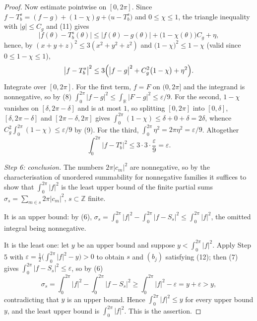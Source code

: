 \begin{proof}
Now estimate pointwise on $[0,2\pi]$.  Since
$f-T_b^s=(f-g)+(1-\chi)g+\bigl(u-T_b^s\bigr)$ and $0\le\chi\le1$, the triangle
inequality with $|g|\le C_g$ and (11) gives
\[
  \bigl|f(\theta)-T_b^s(\theta)\bigr|
  \le\bigl|f(\theta)-g(\theta)\bigr|+\bigl(1-\chi(\theta)\bigr)C_g+\eta ,
\]
hence, by $(x+y+z)^2\le3(x^2+y^2+z^2)$ and
$\bigl(1-\chi\bigr)^2\le1-\chi$ (valid since $0\le1-\chi\le1$),
\[
  \bigl|f-T_b^s\bigr|^2
  \le3\Bigl(\bigl|f-g\bigr|^2+C_g^2\bigl(1-\chi\bigr)+\eta^2\Bigr).
\]
Integrate over $[0,2\pi]$.  For the first term, $f=F$ on $(0,2\pi]$ and the
integrand is nonnegative, so by (8)
$\int_0^{2\pi}|f-g|^2\le\int_{\mathbb{R}}|F-g|^2\le\varepsilon/9$.  For the
second, $1-\chi$ vanishes on $[\delta,2\pi-\delta]$ and is at most $1$, so
splitting $[0,2\pi]$ into $[0,\delta]$, $[\delta,2\pi-\delta]$ and
$[2\pi-\delta,2\pi]$ gives $\int_0^{2\pi}(1-\chi)\le\delta+0+\delta=2\delta$,
whence $C_g^2\int_0^{2\pi}(1-\chi)\le\varepsilon/9$ by (9).  For the third,
$\int_0^{2\pi}\eta^2=2\pi\eta^2=\varepsilon/9$.  Altogether
\begin{equation}\tag{12}
  \int_0^{2\pi}\bigl|f-T_b^s\bigr|^2\le3\cdot3\cdot\frac{\varepsilon}{9}=\varepsilon .
\end{equation}

\emph{Step 6: conclusion.}  The numbers $2\pi|c_m|^2$ are nonnegative, so by
the characterisation of unordered summability for nonnegative families it
suffices to show that
$\int_0^{2\pi}|f|^2$ is the least upper bound of the finite partial sums
$\sigma_s=\sum_{m\in s}2\pi|c_m|^2$, $s\subset\mathbb{Z}$ finite.

It is an upper bound: by (6), $\sigma_s=\int_0^{2\pi}|f|^2-\int_0^{2\pi}|f-S_s|^2
\le\int_0^{2\pi}|f|^2$, the omitted integral being nonnegative.

It is the least one: let $y$ be an upper bound and suppose
$y<\int_0^{2\pi}|f|^2$.  Apply Step 5 with
$\varepsilon=\tfrac12\bigl(\int_0^{2\pi}|f|^2-y\bigr)>0$ to obtain $s$ and
$(b_j)$ satisfying (12); then (7) gives
$\int_0^{2\pi}|f-S_s|^2\le\varepsilon$, so by (6)
\[
  \sigma_s=\int_0^{2\pi}|f|^2-\int_0^{2\pi}\bigl|f-S_s\bigr|^2
  \ge\int_0^{2\pi}|f|^2-\varepsilon=y+\varepsilon>y ,
\]
contradicting that $y$ is an upper bound.  Hence
$\int_0^{2\pi}|f|^2\le y$ for every upper bound $y$, and the least upper bound
is $\int_0^{2\pi}|f|^2$.  This is the assertion.
\end{proof}
